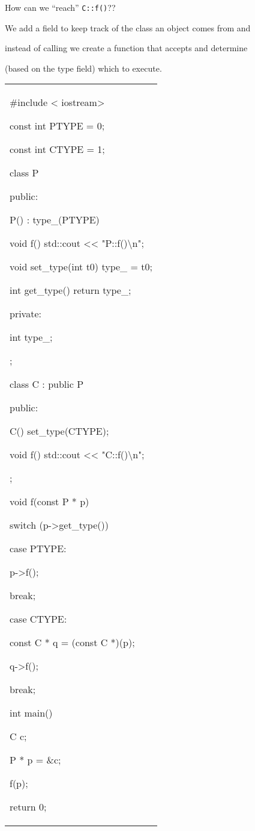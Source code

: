 How can we ``reach'' \texttt{C::f()}??

We add a field to keep track of the class an object comes from and

instead of calling we create a function that accepts and determine

(based on the type field) which to execute.

\begin{longtable}[]{@{}
  >{\raggedright\arraybackslash}p{}@{}}
\toprule\noalign{}
 \\
\midrule\noalign{}
\endhead
\bottomrule\noalign{}
\endlastfoot
\#include < iostream\textgreater{}

const int PTYPE = 0;

const int CTYPE = 1;

class P

{

public:

P() : type_(PTYPE) {}

void f() { std::cout <<{} "P::f()\textbackslash n"; }

void set_type(int t0) { type_ = t0; }

int get_type() { return type_; }

private:

int type_;

};

class C : public P

{

public:

C() { set_type(CTYPE); }

void f() { std::cout <<{} "C::f()\textbackslash n"; }

};

void f(const P * p)

{

switch (p-\textgreater get_type())

{

case PTYPE:

p-\textgreater f();

break;

case CTYPE:

const C * q = (const C *)(p);

q-\textgreater f();

break;

}

}

int main()

{

C c;

P * p = \&c;

f(p);

return 0;

} \\
\end{longtable}

